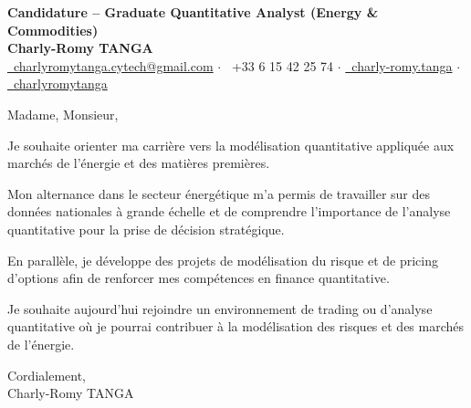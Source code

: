 \documentclass[10pt, letterpaper]{article}
\begin{document}
\begin{center}
    \textbf{\LARGE Candidature -- Graduate Quantitative Analyst (Energy \& Commodities)} \\[0.2cm]
    \textbf{\large Charly-Romy TANGA} \\[0.2cm]
    \href{mailto:charlyromytanga.cytech@gmail.com}{\faEnvelope\ charlyromytanga.cytech@gmail.com}
    \quad$\cdot$\quad
    \faPhone\ +33 6 15 42 25 74
    \quad$\cdot$\quad
    \href{https://www.linkedin.com/in/charly-romy-tanga}{\faLinkedin\ charly-romy.tanga}
    \quad$\cdot$\quad
    \href{https://github.com/charlyromytanga}{\faGithub\ charlyromytanga}
\end{center}

Madame, Monsieur,

Je souhaite orienter ma carrière vers la modélisation quantitative appliquée aux marchés de l'énergie et des matières premières.

Mon alternance dans le secteur énergétique m'a permis de travailler sur des données nationales à grande échelle et de comprendre l'importance de l'analyse quantitative pour la prise de décision stratégique.

En parallèle, je développe des projets de modélisation du risque et de pricing d'options afin de renforcer mes compétences en finance quantitative.

Je souhaite aujourd'hui rejoindre un environnement de trading ou d'analyse quantitative où je pourrai contribuer à la modélisation des risques et des marchés de l'énergie.

Cordialement,\\
Charly-Romy TANGA
\end{document}
